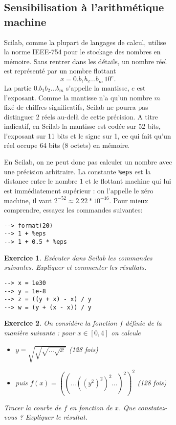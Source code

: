 \documentclass[a4paper,11pt]{article}
\newtheorem{exo}{Exercice}
\begin{document}
\begin{figure}
\begin{figure}
\subsection{Sensibilisation à l'arithmétique machine }

Scilab, comme la plupart de langages de calcul, utilise la norme
IEEE-754 pour le stockage des nombres en mémoire. Sans rentrer dans
les détails, un nombre réel est représenté par un nombre flottant
\begin{equation*}
  x = 0.b_1b_2 \hdots b_m \, 10^e.
\end{equation*}
La partie $0.b_1b_2 \hdots b_m$ s'appelle la mantisse, $e$ est
l'exposant. Comme la mantisse n'a qu'un nombre $m$ fixé de chiffres
significatifs, Scilab ne pourra pas distinguer 2 réels au-delà de cette précision. A
titre indicatif, en Scilab la mantisse est codée sur 52 bits,
l'exposant sur 11 bits et le signe sur 1, ce qui fait qu'un réel
occupe 64 bits (8 octets) en mémoire.

En Scilab, on ne peut donc pas calculer un nombre avec une précision
arbitraire. La constante {\tt \%eps} est la distance entre le nombre
$1$ et le flottant machine qui lui est immédiatement supérieur : on
l'appelle le zéro machine, il vaut $2^{-52} \approx
2.22*10^{-16}$. Pour mieux comprendre, essayez les commandes
suivantes:
\begin{verbatim}
--> format(20)
--> 1 + %eps
--> 1 + 0.5 * %eps
\end{verbatim}

\begin{exo} Exécuter dans Scilab les commandes suivantes. Expliquer et
  commenter les résultats.
\begin{verbatim}
--> x = 1e30
--> y = 1e-8
--> z = ((y + x) - x) / y
--> w = (y + (x - x)) / y
\end{verbatim}
\end{exo}

\begin{exo} On considère la fonction $f$ définie de la manière
  suivante : pour $x \in [0,4]$ on calcule
  \begin{itemize}
  \item $y = \sqrt{\sqrt{\sqrt {\dots{\sqrt{ x}}}}}$ (128 fois)
  \item puis $f(x) = ((\dots((y^2)^2)^2\dots)^2)^2$ (128 fois)
  \end{itemize}
  Tracer la courbe de $f$ en fonction de $x$. Que
  constatez-vous ? Expliquer le résultat.
\end{exo}


\end{figure}
\end{figure}
\end{document}

